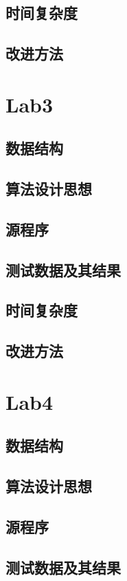 \documentclass[a4paper,11pt,UTF8]{ctexart}
\begin{document}
\subsection{时间复杂度}
\subsection{改进方法}

\section{Lab3}
\subsection{数据结构}
\subsection{算法设计思想}
\subsection{源程序}
\subsection{测试数据及其结果}
\subsection{时间复杂度}
\subsection{改进方法}

\section{Lab4}
\subsection{数据结构}
\subsection{算法设计思想}
\subsection{源程序}
\subsection{测试数据及其结果}
\end{document}
